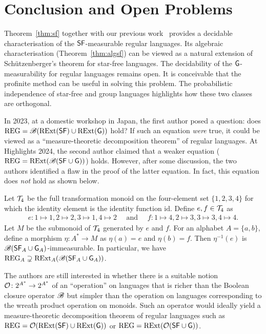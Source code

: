 \section{Conclusion and Open Problems}\label{sec:fut}
Theorem~\ref{thm:sf} together with our previous work~\cite{gdmeasure,ppl2024} provides a decidable characterisation of the \(\sf\)-measurable regular languages.
Its algebraic characterisation (Theorem~\ref{thm:algsf}) can be viewed as a natural extension of Sch\"utzenberger's theorem for star-free languages.
The decidability of the \(\group\)-measurability for regular languages remains open.
It is conceivable that the profinite method can be useful in solving this problem.
The probabilistic independence of star-free and group languages highlights how these two classes are orthogonal.

In 2023, at a domestic workshop in Japan, the first author posed a question: does
\(\reg = \bool(\rext(\sf) \cup \rext(\group))\) hold?
If such an equation \emph{were} true, it could be viewed as a ``measure-theoretic decomposition theorem'' of regular languages.
At Highlights 2024, the second author claimed that a weaker equation
(\(\reg = \rext(\bool(\sf \cup \group))\)) holds.
However, after some discussion, the two authors identified a flaw in the proof of the latter equation.
In fact, this equation does \emph{not} hold as shown below.
\begin{proposition}\label{prop:counterexample}
Let \(\CT_4\) be the full transformation monoid on the four-element set \(\{1,2,3,4\}\) for which the identity element is the identity function \(\mathrm{id}\).
Define \(e, f \in \CT_4\) as
\begin{align*}
 e\colon 1 \mapsto 1, 2 \mapsto 2, 3 \mapsto 1, 4 \mapsto 2 \quad \text{ and } \quad
 f\colon 1 \mapsto 4, 2 \mapsto 3, 3 \mapsto 3, 4 \mapsto 4.
\end{align*}
Let \(M\) be the submonoid of \(\CT_4\) generated by \(e\) and \(f\).
For an alphabet \(A = \{a,b\}\), define a morphism \(\eta\colon A^* \rightarrow M\) as \(\eta(a) = e\) and \(\eta(b) = f\).
Then \(\eta^{-1}(e)\) is \(\bool(\sf_A \cup \group_A)\)-immeasurable.
In particular, we have \(\reg_A \supsetneq \rext_A(\bool(\sf_A \cup \group_A))\).
\end{proposition}
The authors are still interested in whether there is a suitable notion \(\CO\colon 2^{A^*} \rightarrow 2^{A^*}\) of an ``operation'' on languages that is richer than the Boolean closure operator \(\bool\) but simpler than the operation on languages corresponding to the wreath product operation on monoids. Such an operator would ideally yield a measure-theoretic decomposition theorem of regular languages such as
 \(\reg = \CO(\rext(\sf) \cup \rext(\group))\) or
 \(\reg = \rext(\CO(\sf \cup \group))\).

